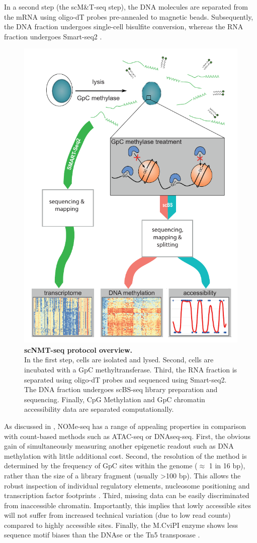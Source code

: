 In a second step (the scM\&T-seq step), the DNA molecules are separated from the mRNA using oligo-dT probes pre-annealed to magnetic beads. Subsequently, the DNA fraction undergoes single-cell bisulfite conversion\cite{Smallwood2014}, whereas the RNA fraction undergoes Smart-seq2 \cite{Picelli2014}.\\

\begin{figure}[H]
	\centering
	\includegraphics[width=0.6\linewidth]{scNMT_protocol}
	\caption[]{\textbf{scNMT-seq protocol overview.}\\
	In the first step, cells are isolated and lysed. Second, cells are incubated with a GpC methyltransferase. Third, the RNA fraction is separated using oligo-dT probes and sequenced using Smart-seq2. The DNA fraction undergoes scBS-seq library preparation and sequencing. Finally, CpG Methylation and GpC chromatin accessibility data are separated computationally.}
	\label{fig:scnmt_protocol}
\end{figure}

As discussed in , NOMe-seq has a range of appealing properties in comparison with count-based methods such as ATAC-seq or DNAseq-seq. First, the obvious gain of simultaneously measuring another epigenetic readout such as DNA methylation with little additional cost. Second, the resolution of the method is determined by the frequency of GpC sites within the genome ($\approx$ 1 in 16 bp), rather than the size of a library fragment (usually >100 bp). This allows the robust inspection of individual regulatory elements, nucleosome positioning and transcription factor footprints \cite{Kelly2012,Pott2016,Nordstrom2019}. Third, missing data can be easily discriminated from inaccessible chromatin. Importantly, this implies that lowly accessible sites will not suffer from increased technical variation (due to low read counts) compared to highly accessible sites. Finally, the M.CviPI enzyme shows less sequence motif biases than the DNAse or the Tn5 transposase \cite{Nordstrom2019}.

